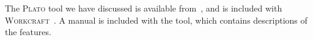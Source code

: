 \documentclass[british,conference,compsoc]{IEEEtran}
\newcommand{\noun}[1]{\textsc{#1}}
\begin{document}

The \noun{Plato} tool we have discussed is available 
from~\cite{2016_concepts_github}, and is included with 
\noun{Workcraft}~\cite{Workcraft_website}. A manual is included with the tool, 
which contains descriptions of the features. 

\vspace{-2.5mm}



\end{document}
